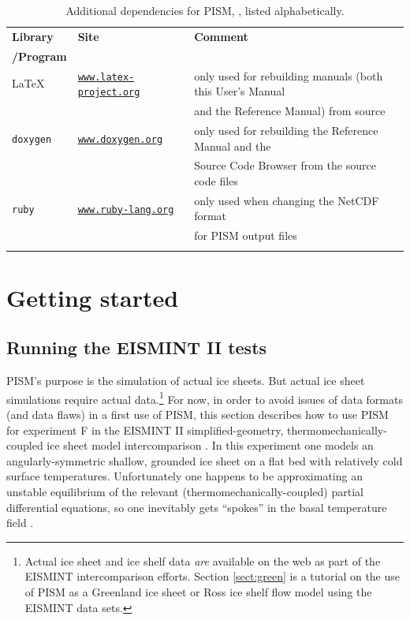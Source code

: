 \documentclass[11pt,final]{amsart}
\renewcommand{\t}[1]{\texttt{#1}}
\begin{document}
\begin{table}[ht]
\caption{Additional dependencies for PISM, , listed alphabetically.  }\label{tab:PISMdepends_superdev}
\small
\begin{tabular}{@{}llll}\hline
\textbf{Library} & \textbf{Site} & \textbf{Comment} \\
\textbf{/Program} &  &  &  \\ \hline
\LaTeX & \href{http://www.latex-project.org/}{\t{www.latex-project.org}} & only used for rebuilding manuals (both this User's Manual  \\
 &  & and the Reference Manual) from source \\
\texttt{doxygen} & \href{http://www.stack.nl/~dimitri/doxygen/}{\t{www.doxygen.org}} & only used for rebuilding the Reference Manual and the \\
 & & Source Code Browser from the source code files \\
\texttt{ruby} & \href{http://www.ruby-lang.org/en/}{\texttt{www.ruby-lang.org}} & only used when changing the NetCDF format \\
 &  & for PISM output files \\
\hline
\normalsize
\end{tabular}
\end{table}


\clearpage\newpage
\section{Getting started}\label{sect:start}

\subsection{Running the EISMINT II tests}  PISM's purpose is the simulation of actual ice sheets.  But actual ice sheet simulations require actual data.\footnote{Actual ice sheet and ice shelf data \emph{are} available on the web as part of the EISMINT intercomparison efforts.  Section \ref{sect:green} is a tutorial on the use of PISM as a Greenland ice sheet or Ross ice shelf flow model using the EISMINT data sets.}  For now, in order to avoid issues of data formats (and data flaws) in a first use of PISM, this section describes how to use PISM for experiment F in the EISMINT II simplified-geometry, thermomechanically-coupled ice sheet model intercomparison \cite{EISMINT00}.  In this experiment one models an angularly-symmetric shallow, grounded ice sheet on a flat bed with relatively cold surface temperatures.  Unfortunately one happens to be approximating an unstable equilibrium of the relevant (thermomechanically-coupled) partial differential equations, so one inevitably gets ``spokes'' in the basal temperature field \cite{BBL,PayneBaldwin,SaitoEISMINT}.
\end{document}
